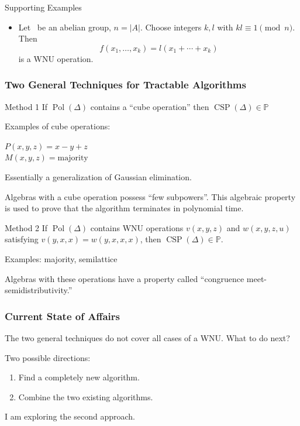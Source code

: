 \documentclass[12pt,xcolor=dvipsnames%
]{beamer}
\DeclareMathOperator{\CSP}{CSP}
\DeclareMathOperator{\Pol}{Pol}
\renewcommand{\.}{\cdot}
\renewcommand{\P}{\ensuremath{\mathbb{P}}\xspace}
\begin{document}
\begin{frame}
\begin{overprint}
\begin{exampleblock}{Supporting Examples}
\begin{itemize}
             \item<6-> Let \A\ be an abelian group, $n=|A|$. Choose
        integers $k, l$ with $kl \equiv 1 \pmod n$. Then
        \begin{equation*}
          f(x_1,\dots,x_k) = l(x_1+\cdots + x_k)
        \end{equation*}
        is a WNU operation.
      \end{itemize}
    \end{exampleblock}
  \end{overprint}
\end{frame}

\begin{frame}
\frametitle{Two General Techniques for Tractable Algorithms}
\begin{exampleblock}{Method 1}
If $\Pol(\Delta)$ contains a ``cube operation'' then $\CSP(\Delta)\in \P$
\end{exampleblock}

\pause
Examples of cube operations: 

$P(x,y,z) = x-y+z$\\
$M(x,y,z) = \text{majority}$

Essentially a generalization of Gaussian elimination. 

Algebras with a cube operation possess ``few subpowers''. This algebraic property is used to prove that the algorithm terminates in polynomial time.

\end{frame}

\begin{frame}
\begin{exampleblock}{Method 2}
If $\Pol(\Delta)$ contains WNU operations $v(x,y,z)$ and $w(x,y,z,u)$ satisfying $v(y,x,x)= w(y,x,x,x)$, then $\CSP(\Delta)\in \P$.
\end{exampleblock}

\pause
Examples: majority, semilattice 

Algebras with these operations have a property called ``congruence meet-semidistributivity.'' 

\end{frame}

\begin{frame}
\frametitle{Current State of Affairs}
The two general techniques do not cover all cases of a WNU. What to do next? 

\medskip
Two possible directions:
\begin{enumerate}
\item Find a completely new algorithm.
\item Combine the two existing algorithms.
\end{enumerate}

I am exploring the second approach.
\end{frame}
\end{document}
